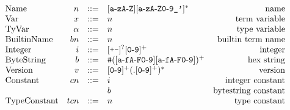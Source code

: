 \documentclass[../plutus-core-specification.tex]{subfiles}
\begin{document}
\begin{minipage}{\linewidth}
    \centering
    \[\begin{array}{lrclr}

        \textrm{Name}        & n      & ::= & [\texttt{a}\!\hyphen{}\!\texttt{z}\texttt{A}\!\hyphen{}\!\texttt{Z}][\texttt{a}\!\hyphen{}\!\texttt{zA}\!\hyphen{}\!\texttt{Z0}\!\hyphen{}\!\texttt{9\_'}]^*   & \textrm{name}\\

        \textrm{Var}           & x      & ::= & n & \textrm{term variable}\\
        \textrm{TyVar}         & \alpha & ::= & n & \textrm{type variable}\\
        \textrm{BuiltinName}   & bn     & ::= & n & \textrm{builtin term name}\\
        \textrm{Integer} & i  & ::= & [\texttt{+-}]^?[\texttt{0}\!\hyphen{}\!\texttt{9}]^+ & \textrm{integer}\\

        \textrm{ByteString}   & b  & ::= & \texttt{\#}([\texttt{a}\!\hyphen{}\!\texttt{fA}\!\hyphen{}\!\texttt{F0}\!\hyphen{}\!\texttt{9}][\texttt{a}\!\hyphen{}\!\texttt{fA}\!\hyphen{}\!\texttt{F0}\!\hyphen{}\!\texttt{9}])^+ & \textrm{hex string}\\

        \textrm{Version} & v & ::= & [\texttt{0}\!\hyphen{}\!\texttt{9}]^+(.[\texttt{0}\!\hyphen{}\!\texttt{9}]^+)^* & \textrm{version}\\

        \textrm{Constant} & cn & ::= & i & \textrm{integer constant}\\
                          &    &     & b & \textrm{bytestring constant}\\

        \textrm{TypeConstant} & tcn    & ::= & n & \textrm{type constant}\\


    \end{array}\]
    \label{fig:Plutus_core_lexical_grammar}
\end{minipage}
\end{document}
